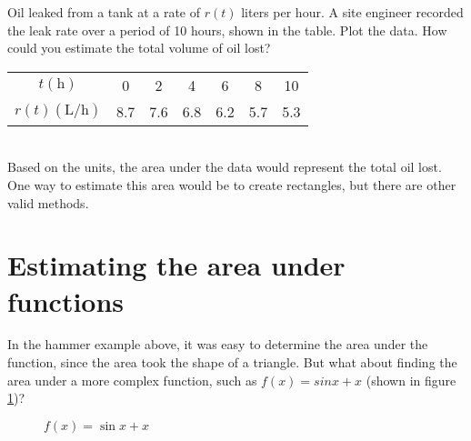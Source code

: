 \begin{Exercise}[label=units3]
	Oil leaked from a tank at a rate of $r(t)$ liters per hour. A site engineer recorded the leak rate over a period of 10 hours, shown in the table. Plot the data. How could you estimate the total volume of oil lost?\\
	\begin{tabular}{c|c|c|c|c|c|c}
	$t(\text{h})$ & 0 & 2 & 4 & 6 & 8 & 10 \\
	$r(t)(\text{L/h})$ & 8.7 & 7.6 & 6.8 & 6.2 & 5.7 & 5.3 \\
	\end{tabular}
\end{Exercise}

\begin{Answer}[ref=units3]
	\\
	Based on the units, the area under the data would represent the total oil lost. One way to estimate this area would be to create rectangles, but there are other valid methods. 
\end{Answer}

\section{Estimating the area under functions}

In the hammer example above, it was easy to determine the area under the function, since the area took the shape of a triangle. But what about finding the area under a more complex function, such as $f(x) = sin{x}+x$ (shown in figure \ref{fig:riemannsine})?

\begin{figure}[htbp]
	\centering
	\caption{$f(x) = \sin{x}+x$}
	\label{fig:riemannsine}
\end{figure} 


